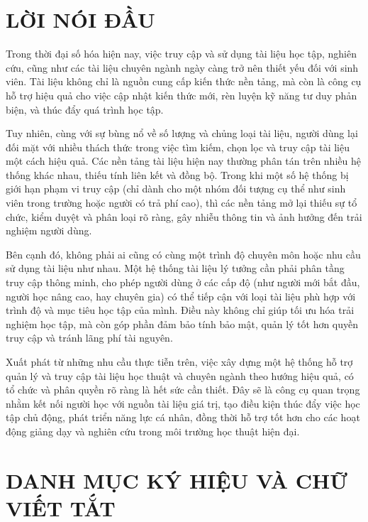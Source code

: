 \documentclass{article}
\begin{document}
	\section*{LỜI NÓI ĐẦU}
	\thispagestyle{empty}
	Trong thời đại số hóa hiện nay, việc truy cập và sử dụng tài liệu học tập, nghiên cứu, cũng như các tài liệu chuyên ngành ngày càng trở nên thiết yếu đối với sinh viên. Tài liệu không chỉ là nguồn cung cấp kiến thức nền tảng, mà còn là công cụ hỗ trợ hiệu quả cho việc cập nhật kiến thức mới, rèn luyện kỹ năng tư duy phản biện, và thúc đẩy quá trình học tập.
	
	Tuy nhiên, cùng với sự bùng nổ về số lượng và chủng loại tài liệu, người dùng lại đối mặt với nhiều thách thức trong việc tìm kiếm, chọn lọc và truy cập tài liệu một cách hiệu quả. Các nền tảng tài liệu hiện nay thường phân tán trên nhiều hệ thống khác nhau, thiếu tính liên kết và đồng bộ. Trong khi một số hệ thống bị giới hạn phạm vi truy cập (chỉ dành cho một nhóm đối tượng cụ thể như sinh viên trong trường hoặc người có trả phí cao), thì các nền tảng mở lại thiếu sự tổ chức, kiểm duyệt và phân loại rõ ràng, gây nhiễu thông tin và ảnh hưởng đến trải nghiệm người dùng.
	
	Bên cạnh đó, không phải ai cũng có cùng một trình độ chuyên môn hoặc nhu cầu sử dụng tài liệu như nhau. Một hệ thống tài liệu lý tưởng cần phải phân tầng truy cập thông minh, cho phép người dùng ở các cấp độ (như người mới bắt đầu, người học nâng cao, hay chuyên gia) có thể tiếp cận với loại tài liệu phù hợp với trình độ và mục tiêu học tập của mình. Điều này không chỉ giúp tối ưu hóa trải nghiệm học tập, mà còn góp phần đảm bảo tính bảo mật, quản lý tốt hơn quyền truy cập và tránh lãng phí tài nguyên.
	
	Xuất phát từ những nhu cầu thực tiễn trên, việc xây dựng một hệ thống hỗ trợ quản lý và truy cập tài liệu học thuật và chuyên ngành theo hướng hiệu quả, có tổ chức và phân quyền rõ ràng là hết sức cần thiết. Đây sẽ là công cụ quan trọng nhằm kết nối người học với nguồn tài liệu giá trị, tạo điều kiện thúc đẩy việc học tập chủ động, phát triển năng lực cá nhân, đồng thời hỗ trợ tốt hơn cho các hoạt động giảng dạy và nghiên cứu trong môi trường học thuật hiện đại.
	\cleardoublepage
	
	\renewcommand{\contentsname}{MỤC LỤC}
	\tableofcontents 
	\thispagestyle{empty}
	\cleardoublepage
	
	\section*{DANH MỤC KÝ HIỆU VÀ CHỮ VIẾT TẮT}
	 {}
	
\end{document}
